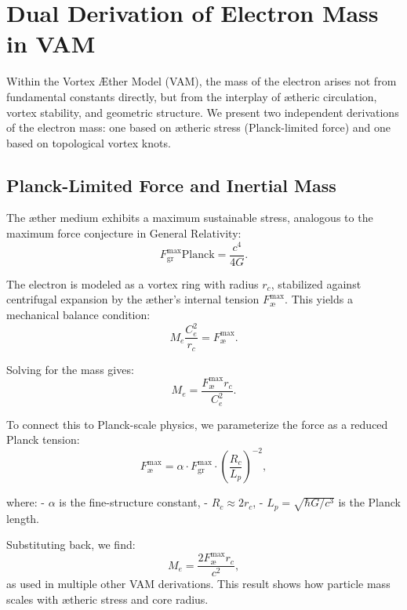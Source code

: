 \section{Dual Derivation of Electron Mass in VAM}
\label{appendix:mass-derivation}

Within the Vortex Æther Model (VAM), the mass of the electron arises not from fundamental constants directly, but from the interplay of ætheric circulation, vortex stability, and geometric structure. We present two independent derivations of the electron mass: one based on ætheric stress (Planck-limited force) and one based on topological vortex knots.

\subsection*{Planck-Limited Force and Inertial Mass}
\label{sec:mass-force-balance}

The æther medium exhibits a maximum sustainable stress, analogous to the maximum force conjecture in General Relativity:
\begin{equation*}
    F^{\text{max}}_{\text{gr}}{\text{Planck}} = \frac{c^4}{4G}.
\end{equation*}

The electron is modeled as a vortex ring with radius \( r_c \), stabilized against centrifugal expansion by the æther's internal tension \( F^{\text{max}}_{\text{\ae}} \). This yields a mechanical balance condition:
\begin{equation*}
    M_e \frac{C_e^2}{r_c} = F^{\text{max}}_{\text{\ae}}.
\end{equation*}

Solving for the mass gives:
\begin{equation*}
    M_e = \frac{F^{\text{max}}_{\text{\ae}} r_c}{C_e^2}.
\end{equation*}

To connect this to Planck-scale physics, we parameterize the force as a reduced Planck tension:
\begin{equation*}
    F^{\text{max}}_{\text{\ae}} =  \alpha \cdot F^{\text{max}}_{\text{gr}} \cdot \left( \frac{R_c}{L_p} \right)^{-2},
\end{equation*}

where:
- \( \alpha \) is the fine-structure constant,
- \( R_c \approx 2 r_c \),
- \( L_p = \sqrt{\hbar G / c^3} \) is the Planck length.

Substituting back, we find:
\begin{equation}
    M_e = \frac{2 F^{\text{max}}_{\text{\ae}} r_c}{c^2},
\end{equation}
as used in multiple other VAM derivations. This result shows how particle mass scales with ætheric stress and core radius.

